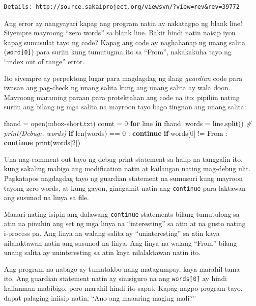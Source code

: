 \documentclass[10pt,]{book}
\newenvironment{Shaded}{}{}
\newcommand{\BuiltInTok}[1]{\textcolor[rgb]{0.00,0.50,0.00}{#1}}
\newcommand{\CommentTok}[1]{\textcolor[rgb]{0.38,0.63,0.69}{\textit{#1}}}
\newcommand{\ControlFlowTok}[1]{\textcolor[rgb]{0.00,0.44,0.13}{\textbf{#1}}}
\newcommand{\DecValTok}[1]{\textcolor[rgb]{0.25,0.63,0.44}{#1}}
\newcommand{\KeywordTok}[1]{\textcolor[rgb]{0.00,0.44,0.13}{\textbf{#1}}}
\newcommand{\NormalTok}[1]{#1}
\newcommand{\OperatorTok}[1]{\textcolor[rgb]{0.40,0.40,0.40}{#1}}
\newcommand{\StringTok}[1]{\textcolor[rgb]{0.25,0.44,0.63}{#1}}
\begin{document}
\begin{enumerate}
{\begin{verbatim}
Details: http://source.sakaiproject.org/viewsvn/?view=rev&rev=39772
\end{verbatim}
}

  Ang error ay nangyayari kapag ang program natin ay nakatagpo ng blank
  line! Siyempre mayroong ``zero words'' sa blank line. Bakit hindi
  natin naisip iyon kapag sumusulat tayo ng code? Kapag ang code ay
  naghahanap ng unang salita (\texttt{word{[}0{]}}) para suriin kung
  tumutugma ito sa ``From'', nakakakuha tayo ng ``index out of range''
  error.

  Ito siyempre ay perpektong lugar para magdagdag ng ilang
  \emph{guardian} code para iwasan ang pag-check ng unang salita kung
  ang unang salita ay wala doon. Mayroong maraming paraan para
  protektahan ang code na ito; pipiliin nating suriin ang bilang ng mga
  salita na mayroon tayo bago tingnan ang unang salita:

\begin{Shaded}
\begin{Highlighting}[]
\NormalTok{fhand }\OperatorTok{=} \BuiltInTok{open}\NormalTok{(}\StringTok{\textquotesingle{}mbox{-}short.txt\textquotesingle{}}\NormalTok{)}
\NormalTok{count }\OperatorTok{=} \DecValTok{0}
\ControlFlowTok{for}\NormalTok{ line }\KeywordTok{in}\NormalTok{ fhand:}
\NormalTok{    words }\OperatorTok{=}\NormalTok{ line.split()}
    \CommentTok{\# print(\textquotesingle{}Debug:\textquotesingle{}, words)}
    \ControlFlowTok{if} \BuiltInTok{len}\NormalTok{(words) }\OperatorTok{==} \DecValTok{0}\NormalTok{ : }\ControlFlowTok{continue}
    \ControlFlowTok{if}\NormalTok{ words[}\DecValTok{0}\NormalTok{] }\OperatorTok{!=} \StringTok{\textquotesingle{}From\textquotesingle{}}\NormalTok{ : }\ControlFlowTok{continue}
    \BuiltInTok{print}\NormalTok{(words[}\DecValTok{2}\NormalTok{])}
\end{Highlighting}
\end{Shaded}

  Una nag-comment out tayo ng debug print statement sa halip na
  tanggalin ito, kung sakaling mabigo ang modification natin at
  kailangan nating mag-debug ulit. Pagkatapos nagdagdag tayo ng guardian
  statement na sumusuri kung mayroon tayong zero words, at kung gayon,
  ginagamit natin ang \texttt{continue} para laktawan ang susunod na
  linya sa file.

  Maaari nating isipin ang dalawang \texttt{continue} statements bilang
  tumutulong sa atin na pinuhin ang set ng mga linya na ``interesting''
  sa atin at na gusto nating i-process pa. Ang linya na walang salita ay
  ``uninteresting'' sa atin kaya nilalaktawan natin ang susunod na
  linya. Ang linya na walang ``From'' bilang unang salita ay
  uninteresting sa atin kaya nilalaktawan natin ito.

  Ang program na nabago ay tumatakbo nang matagumpay, kaya marahil tama
  ito. Ang guardian statement natin ay sinisiguro na ang
  \texttt{words{[}0{]}} ay hindi kailanman mabibigo, pero marahil hindi
  ito sapat. Kapag nagpo-program tayo, dapat palaging iniisip natin,
  ``Ano ang maaaring maging mali?''
\end{enumerate}
\end{document}
